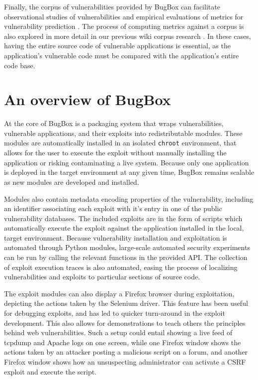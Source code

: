 \documentclass[letterpaper,twocolumn,10pt]{article}
\begin{document}
Finally, the corpus of vulnerabilities provided by BugBox can facilitate observational studies of vulnerabilities \cite{empiricalinvestigation} and empirical evaluations of metrics for vulnerability prediction \cite{evalcomplexityvul,metrisec2012surface}. The process of computing metrics against a corpus is also explored in more detail in our previous wiki corpus research \cite{stuckman2011analyzing}. In these cases, having the entire source code of vulnerable applications is essential, as the application's vulnerable code must be compared with the application's entire code base.

\section{An overview of BugBox}

At the core of BugBox is a packaging system that wraps vulnerabilities, vulnerable applications, and their exploits into redistributable modules. These modules are automatically installed in an isolated \texttt{chroot} environment, that allows for the user to execute the exploit without manually installing the application or risking contaminating a live system. Because only one application is deployed in the target environment at any given time, BugBox remains scalable as new modules are developed and installed.

Modules also contain metadata encoding properties of the vulnerability, including an identifier associating each exploit with it's entry in one of the public vulnerability databases. The included exploits are in the form of scripts which automatically execute the exploit against the application installed in the local, target environment. Because vulnerability installation and exploitation is automated through Python modules, large-scale automated security experiments can be run by calling the relevant functions in the provided API. The collection of exploit execution traces is also automated, easing the process of localizing vulnerabilities and exploits to particular sections of source code.

The exploit modules can also display a Firefox browser during exploitation, depicting the actions taken by the Selenium driver. This feature has been useful for debugging exploits, and has led to quicker turn-around in the exploit development. This also allows for demonstrations to teach others the principles behind web vulnerabilities.  Such a setup could entail showing a live feed of tcpdump and Apache logs on one screen, while one Firefox window shows the actions taken by an attacker posting a malicious script on a forum, and another Firefox window shows how an unsuspecting administrator can activate a CSRF exploit and execute the script. 
\end{document}
